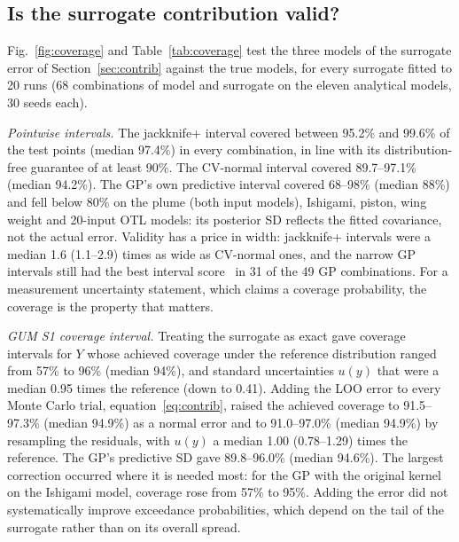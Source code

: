 
\subsection{Is the surrogate contribution valid?}
\label{sec:res-coverage}
Fig.~\ref{fig:coverage} and Table~\ref{tab:coverage} test the three models of
the surrogate error of Section~\ref{sec:contrib} against the true models, for
every surrogate fitted to 20 runs (68 combinations of model and surrogate on
the eleven analytical models, 30 seeds each).

\emph{Pointwise intervals.} The jackknife+ interval covered between 95.2\%
and 99.6\% of the test points (median 97.4\%) in every combination, in line
with its distribution-free guarantee of at least 90\%. The CV-normal interval
covered 89.7--97.1\% (median 94.2\%). The GP's own predictive interval
covered 68--98\% (median 88\%) and fell below 80\% on the plume (both
input models), Ishigami, piston, wing weight and 20-input OTL models: its
posterior SD reflects the fitted covariance, not the actual error. Validity
has a price in width: jackknife+ intervals were a median 1.6 (1.1--2.9)
times as wide as CV-normal ones, and the narrow GP intervals still had the
best interval score~\cite{gneiting2007} in 31 of the 49 GP combinations. For a measurement
uncertainty statement, which claims a coverage probability, the coverage is
the property that matters.

\emph{GUM S1 coverage interval.} Treating the surrogate as exact gave
coverage intervals for $Y$ whose achieved coverage under the reference
distribution ranged from 57\% to 96\% (median 94\%), and standard
uncertainties $u(y)$ that were a median 0.95 times the reference (down to
0.41). Adding the LOO error to every Monte Carlo trial,
equation~\eqref{eq:contrib}, raised the achieved coverage to 91.5--97.3\%
(median 94.9\%) as a normal error and to 91.0--97.0\% (median 94.9\%) by
resampling the residuals, with $u(y)$ a median 1.00 (0.78--1.29) times the
reference. The GP's predictive SD gave 89.8--96.0\% (median 94.6\%). The
largest correction occurred where it is needed most: for the GP with the
original kernel on the Ishigami model, coverage rose from 57\% to 95\%.
Adding the error did not systematically improve exceedance probabilities,
which depend on the tail of the surrogate rather than on its overall
spread.

